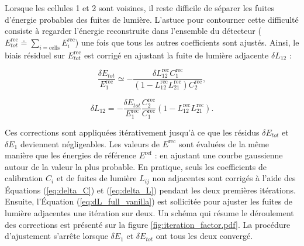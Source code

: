 
Lorsque les cellules 1 et 2 sont voisines, il reste difficile de séparer les fuites d'énergie probables des fuites de lumière. L'astuce pour contourner cette difficulté consiste à regarder l'énergie reconstruite dans l'ensemble du détecteur ($E^{\textrm{rec}}_{tot} \doteq \sum_{i = \textrm{cells}} E^\textrm{rec}_i$) une fois que tous les autres coefficients sont ajustés. Ainsi, le biais résiduel sur $E^{\textrm{rec}}_{tot}$ est corrigé en ajustant la fuite de lumière adjacente $\delta L_{12}$ :

\begin{equation}
\label{eq:dE_full}
  \frac{\delta E_{tot}}{E^{\textrm{rec}}_1} \simeq - \frac{\delta L^{\textrm{rec}}_{12}C^{\textrm{rec}}_1}{(1 - L^{\textrm{rec}}_{12}L^{\textrm{rec}}_{21})C^{\textrm{rec}}_2},
\end{equation}

\begin{equation}
\label{eq:dL_full_vanilla}
  \delta L_{12} = - \frac{\delta E_{tot}}{E_1^{\textrm{rec}}}\frac{C_2^{\textrm{rec}}}{C_1^{\textrm{rec}}}(1 - L_{12}^{\textrm{rec}}L_{21}^{\textrm{rec}}).
\end{equation}

\bigbreak

Ces corrections sont appliquées itérativement jusqu'à ce que les résidus $\delta E_{tot}$ et $\delta E_1$ deviennent négligeables. Les valeurs de $E^{\textrm{rec}}$ sont évaluées de la même manière que les énergies de référence $E^{\textrm{ref}}$ : en ajustant une courbe gaussienne autour de la valeur la plus probable. En pratique, seuls les coefficients de calibration $C_i$ et de fuites de lumière $L_{ij}$ non adjacentes sont corrigés à l'aide des \'Equations (\ref{eq:delta_C}) et (\ref{eq:delta_L}) pendant les deux premières itérations. Ensuite, l'\'Equation (\ref{eq:dL_full_vanilla}) est sollicitée pour ajuster les fuites de lumière adjacentes une itération sur deux. Un schéma qui résume le déroulement des corrections est présenté sur la figure \ref{fig:iteration_factor.pdf}. La procédure d'ajustement s'arrête lorsque $\delta E_1$ et $\delta E_{tot}$ ont tous les deux convergé.\\

